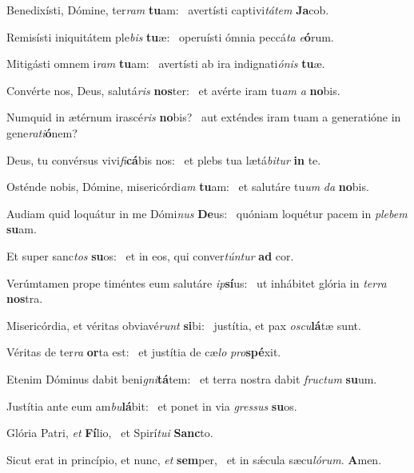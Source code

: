 \item Benedixísti, Dómine, ter\textit{ram} \textbf{tu}am:~\psstar{} avertísti captivi\textit{tátem} \textbf{Ja}cob.

\item Remisísti iniquitátem ple\textit{bis} \textbf{tu}æ:~\psstar{} operuísti ómnia peccá\textit{ta} \textit{e}\textbf{ó}rum.

\item Mitigásti omnem i\textit{ram} \textbf{tu}am:~\psstar{} avertísti ab ira indignati\textit{ónis} \textbf{tu}æ.

\item Convérte nos, Deus, salutá\textit{ris} \textbf{nos}ter:~\psstar{} et avérte iram tu\textit{am} \textit{a} \textbf{no}bis.

\item Numquid in ætérnum irascé\textit{ris} \textbf{no}bis?~\psstar{} aut exténdes iram tuam a generatióne in gene\textit{rati}\textbf{ó}nem?

\item Deus, tu convérsus vivi\textit{fi}\textbf{cá}bis nos:~\psstar{} et plebs tua lætá\textit{bitur} \textbf{in} te.

\item Osténde nobis, Dómine, misericórdi\textit{am} \textbf{tu}am:~\psstar{} et salutáre tu\textit{um} \textit{da} \textbf{no}bis.

\item Audiam quid loquátur in me Dómi\textit{nus} \textbf{De}us:~\psstar{} quóniam loquétur pacem in \textit{plebem} \textbf{su}am.

\item Et super sanc\textit{tos} \textbf{su}os:~\psstar{} et in eos, qui conver\textit{túntur} \textbf{ad} cor.

\item Verúmtamen prope timéntes eum salutáre \textit{ip}\textbf{sí}us:~\psstar{} ut inhábitet glória in \textit{terra} \textbf{nos}tra.

\item Misericórdia, et véritas obviavé\textit{runt} \textbf{si}bi:~\psstar{} justítia, et pax \textit{oscu}\textbf{lá}tæ sunt.

\item Véritas de ter\textit{ra} \textbf{or}ta est:~\psstar{} et justítia de cæ\textit{lo} \textit{pro}\textbf{spé}xit.

\item Etenim Dóminus dabit beni\textit{gni}\textbf{tá}tem:~\psstar{} et terra nostra dabit \textit{fructum} \textbf{su}um.

\item Justítia ante eum am\textit{bu}\textbf{lá}bit:~\psstar{} et ponet in via \textit{gressus} \textbf{su}os.

\item Glória Patri, \textit{et} \textbf{Fí}lio,~\psstar{} et Spirí\textit{tui} \textbf{Sanc}to.

\item Sicut erat in princípio, et nunc, \textit{et} \textbf{sem}per,~\psstar{} et in sǽcula sæcu\textit{lórum}. \textbf{A}men.
